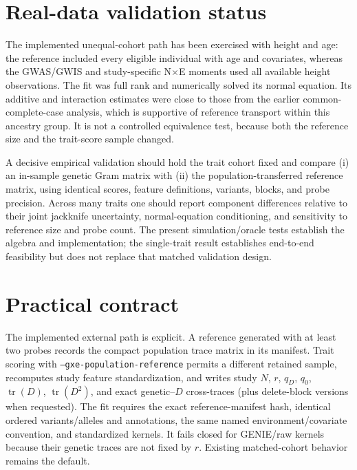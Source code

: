 \documentclass[11pt]{article}
\newcommand{\tr}{\operatorname{tr}}
\begin{document}
\section{Real-data validation status}

The implemented unequal-cohort path has been exercised with height and age:
the reference included every eligible individual with age and covariates,
whereas the GWAS/GWIS and study-specific N$\times$E moments used all available
height observations.  The fit was full rank and numerically solved its normal
equation.  Its additive and interaction estimates were close to those from
the earlier common-complete-case analysis, which is supportive of reference
transport within this ancestry group.  It is not a controlled equivalence
test, because both the reference size and the trait-score sample changed.

A decisive empirical validation should hold the trait cohort fixed and compare
(i) an in-sample genetic Gram matrix with (ii) the population-transferred
reference matrix, using identical scores, feature definitions, variants,
blocks, and probe precision.  Across many traits one should report component
differences relative to their joint jackknife uncertainty, normal-equation
conditioning, and sensitivity to reference size and probe count.  The present
simulation/oracle tests establish the algebra and implementation; the
single-trait result establishes end-to-end feasibility but does not replace
that matched validation design.

\section{Practical contract}

The implemented external path is explicit.  A reference generated with at
least two probes records the compact population trace matrix in its manifest.
Trait scoring with \texttt{--gxe-population-}\allowbreak\texttt{reference} permits a different
retained sample, recomputes study feature standardization, and writes study
$N$, $r$, $q_D$, $q_0$, $\tr(D)$, $\tr(D^2)$, and exact genetic--$D$
cross-traces (plus delete-block versions when requested).  The fit requires the exact
reference-manifest hash, identical ordered variants/alleles and annotations,
the same named environment/covariate convention, and standardized kernels.
It fails closed for GENIE/raw kernels because their genetic traces are not
fixed by $r$.  Existing matched-cohort behavior remains the default.
\end{document}
